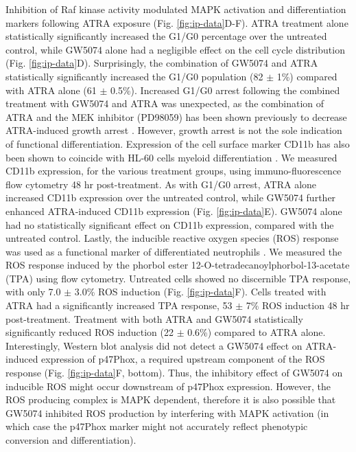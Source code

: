 \documentclass[12pt]{article}
\begin{document}
Inhibition of Raf kinase activity modulated MAPK activation and differentiation markers following ATRA exposure (Fig. \ref{fig:ip-data}D-F).
ATRA treatment alone statistically significantly increased the G1/G0 percentage over the untreated control,
while GW5074 alone had a negligible effect on the cell cycle distribution (Fig. \ref{fig:ip-data}D).
Surprisingly, the combination of GW5074 and ATRA statistically significantly increased the G1/G0 population (82 $\pm$ 1\%)
compared with ATRA alone (61 $\pm$ 0.5\%).
Increased G1/G0 arrest following the combined treatment with GW5074 and ATRA was unexpected,
as the combination of ATRA and the MEK inhibitor (PD98059) has been shown previously to decrease ATRA-induced growth arrest \cite{Yen1998}.
However, growth arrest is not the sole indication of functional differentiation.
Expression of the cell surface marker CD11b has also been shown to coincide with HL-60 cells myeloid differentiation \cite{Hickstein1989}.
We measured CD11b expression, for the various treatment groups, using immuno-fluorescence flow cytometry 48 hr post-treatment.
As with G1/G0 arrest, ATRA alone increased CD11b expression over the untreated control,
while GW5074 further enhanced ATRA-induced CD11b expression (Fig. \ref{fig:ip-data}E).
GW5074 alone had no statistically significant effect on CD11b expression, compared with the untreated control.
Lastly, the inducible reactive oxygen species (ROS) response was used as a functional marker of differentiated neutrophils \cite{Congleton2011}.
We measured the ROS response induced by the phorbol ester 12-O-tetradecanoylphorbol-13-acetate (TPA) using flow cytometry.
Untreated cells showed no discernible TPA response,
with only 7.0 $\pm$ 3.0\% ROS induction (Fig. \ref{fig:ip-data}F).
Cells treated with ATRA had a significantly increased TPA response, 53 $\pm$ 7\% ROS induction 48 hr post-treatment.
Treatment with both ATRA and GW5074 statistically significantly reduced ROS induction (22 $\pm$ 0.6\%) compared to ATRA alone.
Interestingly, Western blot analysis did not detect a GW5074 effect on ATRA-induced expression of p47Phox,
a required upstream component of the ROS response  (Fig. \ref{fig:ip-data}F, bottom).
Thus, the inhibitory effect of GW5074 on inducible ROS might occur downstream of p47Phox expression.
However, the ROS producing complex is MAPK dependent,
therefore it is also possible that GW5074 inhibited ROS production by interfering
with MAPK activation (in which case the p47Phox marker might not accurately reflect phenotypic conversion and differentiation).
\end{document}
